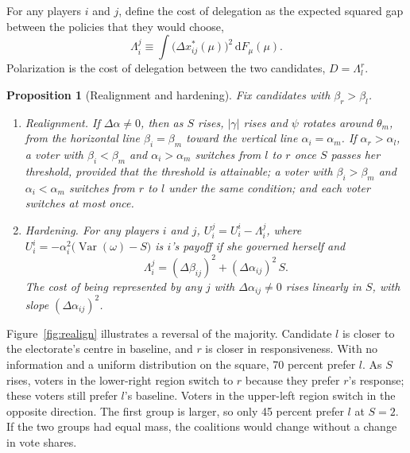 \documentclass[12pt,letterpaper]{article}
\newtheorem{proposition}{Proposition}
\begin{document}
For any players $i$ and $j$, define the cost of delegation as the expected squared gap between the policies that they would choose,
\[
\Lambda_i^j\equiv\int\big(\Delta x^*_{ij}(\mu)\big)^2\,\mathrm{d}F_\mu(\mu).
\]
Polarization is the cost of delegation between the two candidates, $D=\Lambda_l^r$.

\begin{proposition}[Realignment and hardening]\label{prop:realign}\label{prop:office}
Fix candidates with $\beta_r>\beta_l$.
\begin{enumerate}
  \item[(a)] \emph{Realignment.} If $\Delta\alpha\ne0$, then as $S$ rises, $|\gamma|$ rises and $\psi$ rotates around $\theta_m$, from the horizontal line $\beta_i=\beta_m$ toward the vertical line $\alpha_i=\alpha_m$. If $\alpha_r>\alpha_l$, a voter with $\beta_i<\beta_m$ and $\alpha_i>\alpha_m$ switches from $l$ to $r$ once $S$ passes her threshold, provided that the threshold is attainable; a voter with $\beta_i>\beta_m$ and $\alpha_i<\alpha_m$ switches from $r$ to $l$ under the same condition; and each voter switches at most once.
  \item[(b)] \emph{Hardening.} For any players $i$ and $j$, $U_i^j=U_i^i-\Lambda_i^j$, where $U_i^i=-\alpha_i^2\big(\operatorname{Var}(\omega)-S\big)$ is $i$'s payoff if she governed herself and
  \[
  \Lambda_i^j=(\Delta\beta_{ij})^2+(\Delta\alpha_{ij})^2\,S .
  \]
  The cost of being represented by any $j$ with $\Delta\alpha_{ij}\ne0$ rises linearly in $S$, with slope $(\Delta\alpha_{ij})^2$.
\end{enumerate}
\end{proposition}

Figure~\ref{fig:realign} illustrates a reversal of the majority. Candidate $l$ is closer to the electorate's centre in baseline, and $r$ is closer in responsiveness. With no information and a uniform distribution on the square, 70 percent prefer $l$. As $S$ rises, voters in the lower-right region switch to $r$ because they prefer $r$'s response; these voters still prefer $l$'s baseline. Voters in the upper-left region switch in the opposite direction. The first group is larger, so only 45 percent prefer $l$ at $S=2$. If the two groups had equal mass, the coalitions would change without a change in vote shares.
\end{document}
